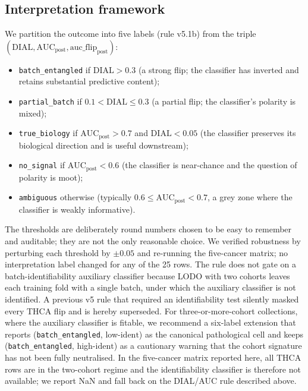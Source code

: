 \documentclass[11pt,a4paper]{article}
\begin{document}
\subsection{Interpretation framework}
We partition the outcome into five labels (rule v5.1b) from the
triple $(\mathrm{DIAL}, \mathrm{AUC}_{\mathrm{post}},
\mathrm{auc\_flip}_{\mathrm{post}})$:
\begin{itemize}
  \item \texttt{batch\_entangled} if $\mathrm{DIAL} > 0.3$ (a strong
    flip; the classifier has inverted and retains substantial
    predictive content);
  \item \texttt{partial\_batch} if $0.1 < \mathrm{DIAL} \leq 0.3$
    (a partial flip; the classifier's polarity is mixed);
  \item \texttt{true\_biology} if $\mathrm{AUC}_{\mathrm{post}} > 0.7$
    and $\mathrm{DIAL} < 0.05$ (the classifier preserves its
    biological direction and is useful downstream);
  \item \texttt{no\_signal} if $\mathrm{AUC}_{\mathrm{post}} < 0.6$
    (the classifier is near-chance and the question of polarity is
    moot);
  \item \texttt{ambiguous} otherwise (typically
    $0.6 \leq \mathrm{AUC}_{\mathrm{post}} < 0.7$, a grey zone where
    the classifier is weakly informative).
\end{itemize}
The thresholds are deliberately round numbers chosen to be easy to
remember and auditable; they are not the only reasonable choice. We
verified robustness by perturbing each threshold by $\pm 0.05$ and
re-running the five-cancer matrix; no interpretation label changed
for any of the 25 rows. The rule does not gate on a
batch-identifiability auxiliary classifier because LODO with two
cohorts leaves each training fold with a single batch, under which
the auxiliary classifier is not identified. A previous v5 rule that
required an identifiability test silently masked every THCA flip and
is hereby superseded. For three-or-more-cohort collections, where the
auxiliary classifier is fitable, we recommend a six-label extension
that reports (\texttt{batch\_entangled}, low-$\mathrm{ident}$) as the
canonical pathological cell and keeps (\texttt{batch\_entangled},
high-$\mathrm{ident}$) as a cautionary warning that the cohort
signature has not been fully neutralised. In the five-cancer matrix
reported here, all THCA rows are in the two-cohort regime and the
identifiability classifier is therefore not available; we report NaN
and fall back on the DIAL/AUC rule described above.
\end{document}
